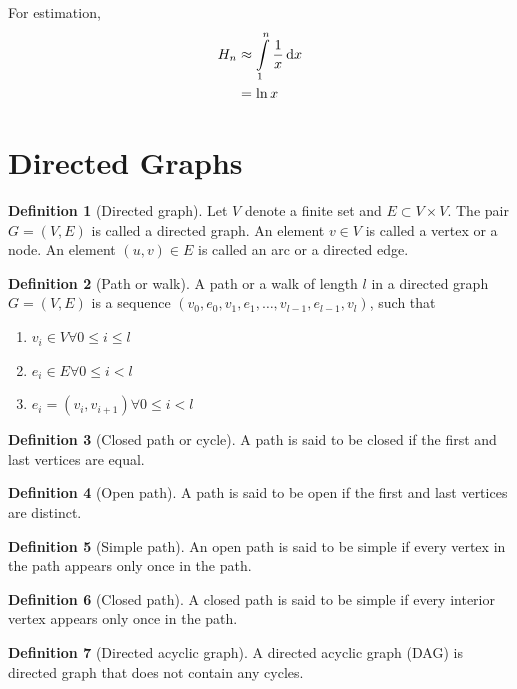 \documentclass[fleqn, a4paper, 12pt, twoside]{article}
\theoremstyle{definition}
\newtheorem{definition}{Definition}
\theoremstyle{theorem}
\begin{document}
For estimation,
\begin{align*}
	H_n &\approx \int\limits_{1}^{n} \dfrac{1}{x} \dif x\\
	&= \ln x
\end{align*}

\section{Directed Graphs}

\begin{definition}[Directed graph]
	Let $V$ denote a finite set and $E \subset V \times V$. The pair $ G = (V,E)$ is called a directed graph. An element $v \in V$ is called a vertex or a node. An element $(u,v) \in E$ is called an arc or a directed edge.
\end{definition}

\begin{definition}[Path or walk]
	A path or a walk of length $l$ in a directed graph $G = (V,E)$ is a sequence $(v_0, e_0, v_1, e_1, \dots, v_{l - 1}, e_{l - 1}, v_l)$, such that
	\begin{enumerate}
		\item $v_i \in V \forall 0 \leq i \leq l$
		\item $e_i \in E \forall 0 \leq i < l$
		\item $e_i = (v_i, v_{i + 1}) \forall 0 \leq i < l$
	\end{enumerate}
\end{definition}

\begin{definition}[Closed path or cycle]
	A path is said to be closed if the first and last vertices are equal.
\end{definition}

\begin{definition}[Open path]
	A path is said to be open if the first and last vertices are distinct.
\end{definition}

\begin{definition}[Simple path]
	An open path is said to be simple if every vertex in the path appears only once in the path.
\end{definition}

\begin{definition}[Closed path]
	A closed path is said to be simple if every interior vertex appears only once in the path.
\end{definition}

\begin{definition}[Directed acyclic graph]
	A directed acyclic graph (DAG) is directed graph that does not contain any cycles.
\end{definition}
\end{document}
